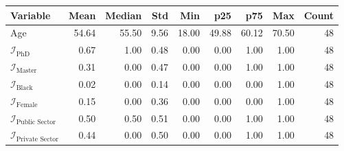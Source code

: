 \begin{tabular}{lrrrrrrrr}
\toprule
                              Variable &  Mean &  Median &  Std &   Min &   p25 &   p75 &   Max &  Count \\
\midrule
                                   Age & 54.64 &   55.50 & 9.56 & 18.00 & 49.88 & 60.12 & 70.50 &     48 \\
            $\mathcal{I}_{\text{PhD}}$ &  0.67 &    1.00 & 0.48 &  0.00 &  0.00 &  1.00 &  1.00 &     48 \\
         $\mathcal{I}_{\text{Master}}$ &  0.31 &    0.00 & 0.47 &  0.00 &  0.00 &  1.00 &  1.00 &     48 \\
          $\mathcal{I}_{\text{Black}}$ &  0.02 &    0.00 & 0.14 &  0.00 &  0.00 &  0.00 &  1.00 &     48 \\
         $\mathcal{I}_{\text{Female}}$ &  0.15 &    0.00 & 0.36 &  0.00 &  0.00 &  0.00 &  1.00 &     48 \\
  $\mathcal{I}_{\text{Public Sector}}$ &  0.50 &    0.50 & 0.51 &  0.00 &  0.00 &  1.00 &  1.00 &     48 \\
 $\mathcal{I}_{\text{Private Sector}}$ &  0.44 &    0.00 & 0.50 &  0.00 &  0.00 &  1.00 &  1.00 &     48 \\
\bottomrule
\end{tabular}

